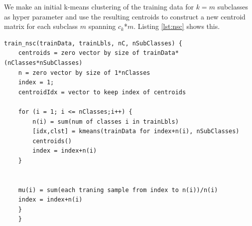 \documentclass[journal]{IEEEtran}
\begin{document}
We make an initial k-means clustering of the training data for $k=m$ subclasses as hyper parameter and use the resulting centroids to construct a new centroid matrix for each subclass $m$ spanning $c_{k}$*$m$. Listing \ref{lst:nsc} shows this.

\begin{minipage}[H]{0.95\linewidth}
	\begin{lstlisting}[caption=Implementation of NSC., label={lst:nsc}]
	train_nsc(trainData, trainLbls, nC, nSubClasses) {
	centroids = zero vector by size of trainData*(nClasses*nSubClasses)
	n = zero vector by size of 1*nClasses
	index = 1;
	centroidIdx = vector to keep index of centroids
	
	for (i = 1; i <= nClasses;i++) {
		n(i) = sum(num of classes i in trainLbls)
		[idx,clst] = kmeans(trainData for index+n(i), nSubClasses)
		centroids()
		index = index+n(i)
	}
		
		
	mu(i) = sum(each traning sample from index to n(i))/n(i)		
	index = index+n(i)
	}
	}
	\end{lstlisting}
\end{minipage}





















 
\end{document}
